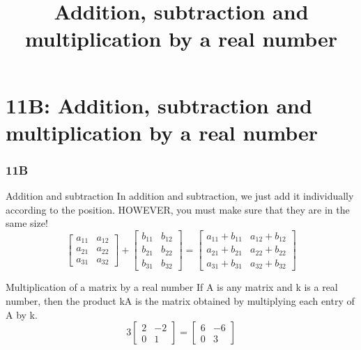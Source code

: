 \documentclass[
	11pt, %
]{beamer}
\begin{document}
\section{11B: Addition, subtraction and multiplication by a real number}
\begin{frame}
    \frametitle{11B}
    \begin{center}
        \title{Addition, subtraction and multiplication by a real number}
        \maketitle
    \end{center}
\end{frame}

\begin{frame}{Addition and subtraction}
    In addition and subtraction, we just add it individually according to the position. \alert{HOWEVER}, you must make sure
    that they are in the same size!\\
    \bigskip
    \[
    \begin{bmatrix}
        a_{11} & a_{12} \\
        a_{21} & a_{22} \\
        a_{31} & a_{32}
    \end{bmatrix}
    +
    \begin{bmatrix}
        b_{11} & b_{12} \\
        b_{21} & b_{22} \\
        b_{31} & b_{32}
    \end{bmatrix}
    =
    \begin{bmatrix}
        a_{11} + b_{11} & a_{12} + b_{12}\\
        a_{21} + b_{21} & a_{22} + b_{22}\\
        a_{31} + b_{31} & a_{32} + b_{32}
    \end{bmatrix}
    \]
\end{frame}

\begin{frame}{Multiplication of a matrix by a real number}
    If A is any matrix and k is a real number, then the product kA is the matrix obtained by
    multiplying each entry of A by k.\\
    \[
    3
    \begin{bmatrix}
        2 & -2\\
        0 & 1
    \end{bmatrix}
    =
    \begin{bmatrix}
        6 & -6\\
        0 & 3
    \end{bmatrix}
    \]
\end{frame}
\end{document}
